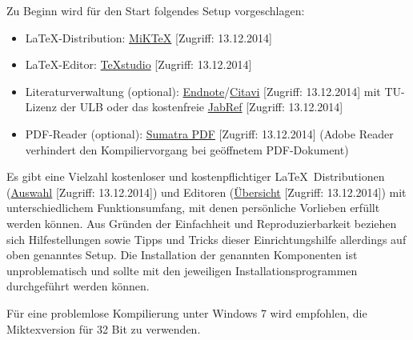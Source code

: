 \newpage
{}
Zu Beginn wird für den Start folgendes Setup vorgeschlagen:
\begin{itemize}
\item \LaTeX-Distribution: \href{http://miktex.org/download}{MiKTeX} [Zugriff: 13.12.2014]
\item \LaTeX-Editor: \href{http://texstudio.sourceforge.net/}{TeXstudio} [Zugriff: 13.12.2014]
\item Literaturverwaltung (optional):
\href{http://www.ulb.tu-darmstadt.de/service/literaturverwaltung_start/endnote_ulb/endnote.de.jsp}{Endnote}/\href{http://www.ulb.tu-darmstadt.de/service/literaturverwaltung_start/citavi_ulb/citavi_ulb.de.jsp}{Citavi} [Zugriff: 13.12.2014] mit TU-Lizenz der ULB oder das kostenfreie \href{http://jabref.sourceforge.net/download.php}{JabRef} [Zugriff: 13.12.2014]
\item PDF-Reader (optional): \href{http://blog.kowalczyk.info/software/sumatrapdf/download-free-pdf-viewer-de.html}{Sumatra PDF} [Zugriff: 13.12.2014] (Adobe Reader verhindert den Kompiliervorgang bei geöffnetem PDF-Dokument)
\end{itemize}
Es gibt eine Vielzahl kostenloser und kostenpflichtiger \LaTeX\ Distributionen (\href{http://www.tug.org/interest.html#free}{Auswahl} [Zugriff: 13.12.2014]) und Editoren (\href{http://en.wikipedia.org/wiki/Comparison_of_TeX_editors}{Übersicht} [Zugriff: 13.12.2014]) mit unterschiedlichem Funktionsumfang, mit denen persönliche Vorlieben erfüllt werden können.
Aus Gründen der Einfachheit und Reproduzierbarkeit beziehen sich Hilfestellungen sowie Tipps und Tricks dieser Einrichtungshilfe allerdings auf oben genanntes Setup. Die Installation der genannten Komponenten ist unproblematisch und sollte mit den jeweiligen Installationsprogrammen durchgeführt werden können.

Für eine problemlose Kompilierung unter Windows 7 wird empfohlen, die Miktexversion für 32 Bit zu verwenden.

